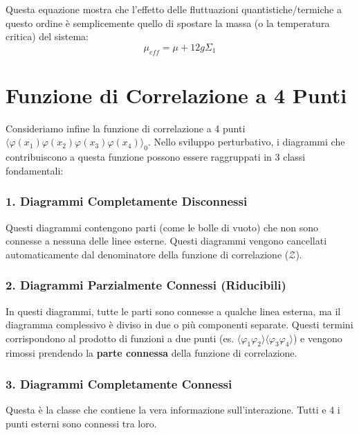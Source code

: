\noindent Questa equazione mostra che l'effetto delle fluttuazioni quantistiche/termiche a questo ordine è semplicemente quello di spostare la massa (o la temperatura critica) del sistema:
\begin{equation}
\mu_{eff} = \mu + 12g \Sigma_1
\end{equation}

\section{Funzione di Correlazione a 4 Punti}

Consideriamo infine la funzione di correlazione a 4 punti $\langle \varphi(x_1)\varphi(x_2)\varphi(x_3)\varphi(x_4) \rangle_0$.
Nello sviluppo perturbativo, i diagrammi che contribuiscono a questa funzione possono essere raggruppati in 3 classi fondamentali:

\subsubsection{1. Diagrammi Completamente Disconnessi}
Questi diagrammi contengono parti (come le bolle di vuoto) che non sono connesse a nessuna delle linee esterne. Questi diagrammi vengono cancellati automaticamente dal denominatore della funzione di correlazione ($\mathcal{Z}$).

\subsubsection{2. Diagrammi Parzialmente Connessi (Riducibili)}
In questi diagrammi, tutte le parti sono connesse a qualche linea esterna, ma il diagramma complessivo è diviso in due o più componenti separate. Questi termini corrispondono al prodotto di funzioni a due punti (es. $\langle \varphi_1 \varphi_2 \rangle \langle \varphi_3 \varphi_4 \rangle$) e vengono rimossi prendendo la \textbf{parte connessa} della funzione di correlazione.

\subsubsection{3. Diagrammi Completamente Connessi}
Questa è la classe che contiene la vera informazione sull'interazione. Tutti e 4 i punti esterni sono connessi tra loro.


